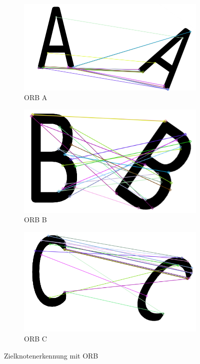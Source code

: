 \begin{figure}[H]
\centering
\begin{subfigure}{0.3\textwidth}
\centering
\includegraphics[width=0.95\linewidth]{assets/informatik-prototyp/opencv/target_node_detection/orb-a.png} 
\caption{ORB A}
\label{fig:orb-a-konzept}
\end{subfigure}
\begin{subfigure}{0.3\textwidth}
\centering
\includegraphics[width=0.95\linewidth]{assets/informatik-prototyp/opencv/target_node_detection/orb-b.png} 
\caption{ORB B}
\label{fig:orb-b-konzept}
\end{subfigure}
\begin{subfigure}{0.3\textwidth}
\centering
\includegraphics[width=0.95\linewidth]{assets/informatik-prototyp/opencv/target_node_detection/orb-c.png} 
\caption{ORB C}
\label{fig:orb-c-konzept}
\end{subfigure}

\caption{Zielknotenerkennung mit ORB}
\label{fig:orb-zielknoten-konzept}
\end{figure}



